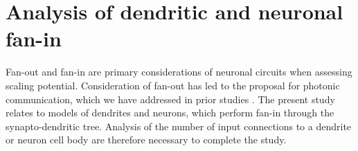 \documentclass[twocolumn]{article}
\begin{document}

%

\section{\label{apx:fan_in}Analysis of dendritic and neuronal fan-in}

Fan-out and fan-in are primary considerations of neuronal circuits when assessing scaling potential. Consideration of fan-out has led to the proposal for photonic communication, which we have addressed in prior studies \cite{shbu2017,chbu2017,chbu2018,sh2018_ICRC,sh2019,sh2020}. The present study relates to models of dendrites and neurons, which perform fan-in through the synapto-dendritic tree. Analysis of the number of input connections to a dendrite or neuron cell body are therefore necessary to complete the study.
\end{document}
